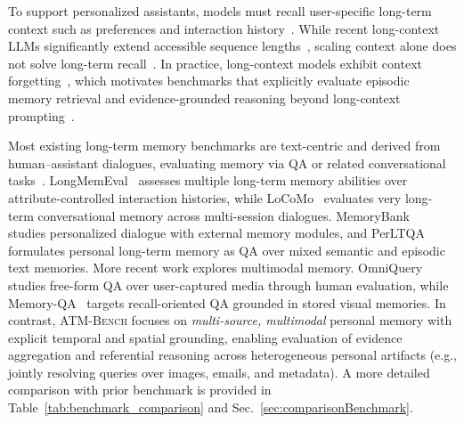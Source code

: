 \documentclass{article}
\theoremstyle{plain}
\theoremstyle{definition}
\theoremstyle{remark}
\begin{document}
To support personalized assistants, models must recall user-specific long-term context such as preferences and interaction history~\citep{li2024personal_llm_agents}. While recent long-context LLMs significantly extend accessible sequence lengths~\citep{Liu2025LongContextLM}, scaling context alone does not solve long-term recall~\citep{hosseini2025LongContextWindowLongSequence}. In practice, long-context models exhibit context forgetting~\citep{liu2024lost}, which motivates benchmarks that explicitly evaluate episodic memory retrieval and evidence-grounded reasoning beyond long-context prompting~\citep{maharana2024locomo,wu2025longmemeval}.

Most existing long-term memory benchmarks are text-centric and derived from human--assistant dialogues, evaluating memory via QA or related conversational tasks~\citep{tan2025membench}. LongMemEval~\citep{wu2025longmemeval} assesses multiple long-term memory abilities over attribute-controlled interaction histories, while LoCoMo~\citep{maharana2024locomo} evaluates very long-term conversational memory across multi-session dialogues. MemoryBank~\citep{Zhong2024MemoryBank} studies personalized dialogue with external memory modules, and PerLTQA~\citep{du2024perltqa} formulates personal long-term memory as QA over mixed semantic and episodic text memories. More recent work explores multimodal memory. OmniQuery~\citep{li2025omniquery} studies free-form QA over user-captured media through human evaluation, while Memory-QA~\citep{jiang2025memoryqa} targets recall-oriented QA grounded in stored visual memories. In contrast, \textsc{ATM-Bench} focuses on \emph{multi-source, multimodal} personal memory with explicit temporal and spatial grounding, enabling evaluation of evidence aggregation and referential reasoning across heterogeneous personal artifacts (e.g., jointly resolving queries over images, emails, and metadata). A more detailed comparison with prior benchmark is provided in Table~\ref{tab:benchmark_comparison} and Sec.~\ref{sec:comparisonBenchmark}.
\end{document}
